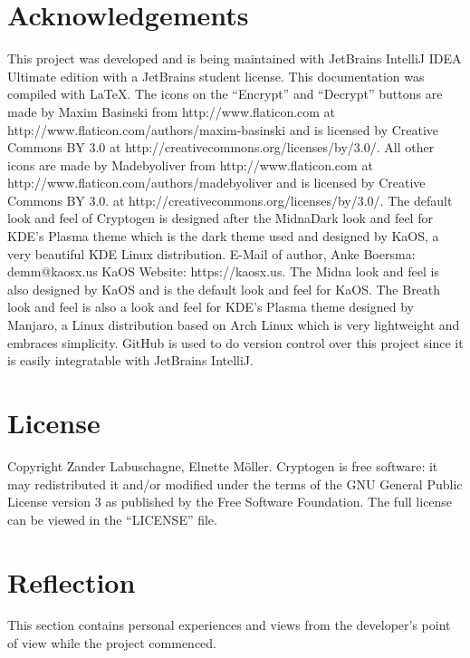 \documentclass[11pt]{article}
\begin{document}
	\section{Acknowledgements}
	This project was developed and is being maintained with JetBrains IntelliJ IDEA Ultimate edition with a JetBrains student license. This documentation was compiled with \LaTeX. The icons on the ``Encrypt'' and ``Decrypt'' buttons are made by Maxim Basinski from http://www.flaticon.com at http://www.flaticon.com/authors/maxim-basinski and is licensed by Creative Commons BY 3.0 at http://creativecommons.org/licenses/by/3.0/. All other icons are made by Madebyoliver from http://www.flaticon.com at http://www.flaticon.com/authors/madebyoliver and is licensed by Creative Commons BY 3.0. at http://creativecommons.org/licenses/by/3.0/. The default look and feel of Cryptogen is designed after the MidnaDark look and feel for KDE's Plasma theme which is the dark theme used and designed by KaOS, a very beautiful KDE Linux distribution. E-Mail of author, Anke Boersma: demm@kaosx.us KaOS Website: https://kaosx.us. The Midna look and feel is also designed by KaOS and is the default look and feel for KaOS. The Breath look and feel is also a look and feel for KDE's Plasma theme designed by Manjaro, a Linux distribution based on Arch Linux which is very lightweight and embraces simplicity. GitHub is used to do version control over this project since it is easily integratable with JetBrains IntelliJ.

	\section{License}
	Copyright \textcopyright {} Zander Labuschagne, Elnette M\"oller. Cryptogen is free software: it may redistributed it and/or modified under the terms of the GNU General Public License version 3 as published by the Free Software Foundation. The full license can be viewed in the ``LICENSE'' file.

    \section{Reflection}
		This section contains personal experiences and views from the developer's point of view while the project commenced.\\
\end{document}
